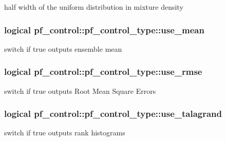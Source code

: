 half width of the uniform distribution in mixture density 

\hypertarget{structpf__control_1_1pf__control__type_a9fb54b12465d1b75e7337fa7b569cac8}{
\subsubsection[{use\-\_\-mean}]{\setlength{\rightskip}{0pt plus 5cm}logical pf\-\_\-control\-::pf\-\_\-control\-\_\-type\-::use\-\_\-mean}}\label{structpf__control_1_1pf__control__type_a9fb54b12465d1b75e7337fa7b569cac8}


switch if true outputs ensemble mean 

\hypertarget{structpf__control_1_1pf__control__type_a47eb88fd006d8ac00206cfd20cd41622}{
\subsubsection[{use\-\_\-rmse}]{\setlength{\rightskip}{0pt plus 5cm}logical pf\-\_\-control\-::pf\-\_\-control\-\_\-type\-::use\-\_\-rmse}}\label{structpf__control_1_1pf__control__type_a47eb88fd006d8ac00206cfd20cd41622}


switch if true outputs Root Mean Square Errors 

\hypertarget{structpf__control_1_1pf__control__type_a8acf4d56e3c012a8d5761ade51cfc48e}{
\subsubsection[{use\-\_\-talagrand}]{\setlength{\rightskip}{0pt plus 5cm}logical pf\-\_\-control\-::pf\-\_\-control\-\_\-type\-::use\-\_\-talagrand}}\label{structpf__control_1_1pf__control__type_a8acf4d56e3c012a8d5761ade51cfc48e}


switch if true outputs rank histograms 


